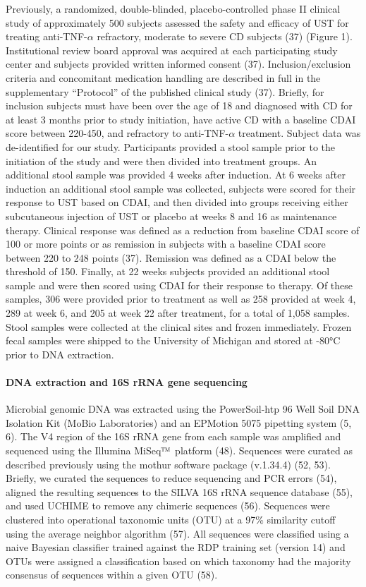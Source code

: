 \documentclass[12pt,]{article}
\let\oldparagraph\paragraph
\renewcommand{\paragraph}[1]{\oldparagraph{#1}\mbox{}}
\begin{document}
Previously, a randomized, double-blinded, placebo-controlled phase II
clinical study of approximately 500 subjects assessed the safety and
efficacy of UST for treating anti-TNF-\({\alpha}\) refractory, moderate
to severe CD subjects (37) (Figure 1). Institutional review board
approval was acquired at each participating study center and subjects
provided written informed consent (37). Inclusion/exclusion criteria and
concomitant medication handling are described in full in the
supplementary ``Protocol'' of the published clinical study (37).
Briefly, for inclusion subjects must have been over the age of 18 and
diagnosed with CD for at least 3 months prior to study initiation, have
active CD with a baseline CDAI score between 220-450, and refractory to
anti-TNF-\({\alpha}\) treatment. Subject data was de-identified for our
study. Participants provided a stool sample prior to the initiation of
the study and were then divided into treatment groups. An additional
stool sample was provided 4 weeks after induction. At 6 weeks after
induction an additional stool sample was collected, subjects were scored
for their response to UST based on CDAI, and then divided into groups
receiving either subcutaneous injection of UST or placebo at weeks 8 and
16 as maintenance therapy. Clinical response was defined as a reduction
from baseline CDAI score of 100 or more points or as remission in
subjects with a baseline CDAI score between 220 to 248 points (37).
Remission was defined as a CDAI below the threshold of 150. Finally, at
22 weeks subjects provided an additional stool sample and were then
scored using CDAI for their response to therapy. Of these samples, 306
were provided prior to treatment as well as 258 provided at week 4, 289
at week 6, and 205 at week 22 after treatment, for a total of 1,058
samples. Stool samples were collected at the clinical sites and frozen
immediately. Frozen fecal samples were shipped to the University of
Michigan and stored at -80°C prior to DNA extraction.

\paragraph{DNA extraction and 16S rRNA gene
sequencing}\label{dna-extraction-and-16s-rrna-gene-sequencing}

Microbial genomic DNA was extracted using the PowerSoil-htp 96 Well Soil
DNA Isolation Kit (MoBio Laboratories) and an EPMotion 5075 pipetting
system (5, 6). The V4 region of the 16S rRNA gene from each sample was
amplified and sequenced using the Illumina
MiSeq\(\text{\texttrademark}\) platform (48). Sequences were curated as
described previously using the mothur software package (v.1.34.4) (52,
53). Briefly, we curated the sequences to reduce sequencing and PCR
errors (54), aligned the resulting sequences to the SILVA 16S rRNA
sequence database (55), and used UCHIME to remove any chimeric sequences
(56). Sequences were clustered into operational taxonomic units (OTU) at
a 97\% similarity cutoff using the average neighbor algorithm (57). All
sequences were classified using a naive Bayesian classifier trained
against the RDP training set (version 14) and OTUs were assigned a
classification based on which taxonomy had the majority consensus of
sequences within a given OTU (58).
\end{document}
